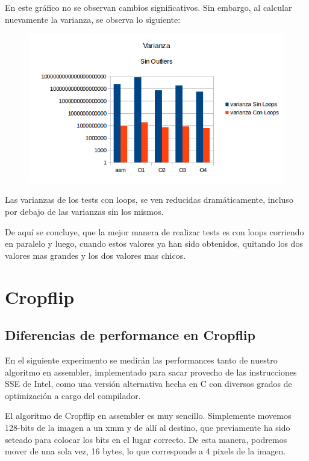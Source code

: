 \documentclass[a4paper]{article}
\begin{document}
En este gráfico no se observan cambios significativos. Sin embargo, al calcular nuevamente la varianza, se observa lo siguiente:

\begin{figure}[h!]
  \begin{center}
	\includegraphics[scale=0.66]{Graficos1.4/1.3/VSO.png}
	\label{nombreparareferenciar4}
  \end{center}
\end{figure}

Las varianzas de los tests con loops, se ven reducidas dramáticamente, incluso por debajo de las varianzas sin los mismos.

De aquí se concluye, que la mejor manera de realizar tests es con loops corriendo en paralelo y luego, cuando estos valores ya han sido obtenidos, quitando los dos valores mas grandes y los dos valores mas chicos.

\newpage
\section{Cropflip}
\subsection{Diferencias de performance en Cropflip}
En el siguiente experimento se medirán las performances tanto de nuestro algoritmo en assembler, implementado para sacar provecho de las instrucciones SSE de Intel, como una versión alternativa hecha en C con diversos grados de optimización a cargo del compilador.

El algoritmo de Cropflip en assembler es muy sencillo. Simplemente movemos 128-bits de la imagen a un xmm y de allí al destino, que previamente ha sido seteado para colocar los bits en el lugar correcto. De esta manera, podremos mover de una sola vez, 16 bytes, lo que corresponde a 4 pixels de la imagen.
\end{document}
